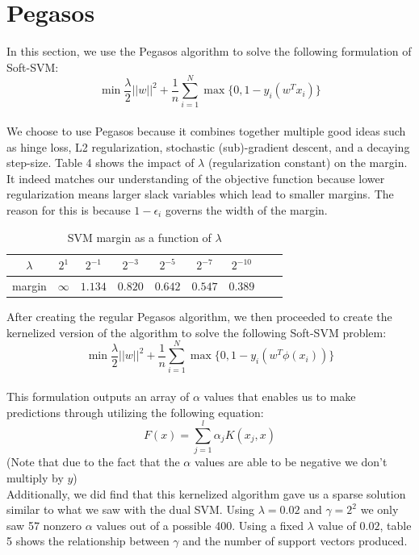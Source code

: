 \documentclass{article}
\begin{document}
\section{Pegasos}

In this section, we use the Pegasos algorithm to solve the following formulation of Soft-SVM: \\
$$\min \frac{\lambda}{2} ||w||^2 + \frac{1}{n} \sum_{i=1}^{N}  \max \{0,1 - y_i(w^T x_i)\}$$\\
We choose to use Pegasos because it combines together multiple good ideas such as hinge loss, L2 regularization, stochastic (sub)-gradient descent, and a decaying step-size. Table 4 shows the impact of $\lambda$ (regularization constant) on the margin. It indeed matches our understanding of the objective function because lower regularization means larger slack variables which lead to smaller margins. The reason for this is because $1-\epsilon_i$ governs the width of the margin.

\begin{table}
  \begin{center}
    \begin{tabular}{ | c | c | c | c | c | c | c | c | c |}
      \hline
       $\lambda$& $2^1$       & $2^{-1}$&  $2^{-3}$& $2^{-5}$&  $2^{-7}$&  $2^{-10}$ \\ \hline
       margin       & $\infty$     & $1.134$&   $0.820$& $0.642$&  $0.547$&   $0.389$  \\ \hline

    \end{tabular}
  \end{center}
  \caption{SVM margin as a function of $\lambda$}
\end{table}

After creating the regular Pegasos algorithm, we then proceeded to create the kernelized version of the algorithm to solve the following Soft-SVM problem: \\
$$\min \frac{\lambda}{2} ||w||^2 + \frac{1}{n} \sum_{i=1}^{N}  \max \{0,1 - y_i(w^T \phi(x_i))\}$$\\

This formulation outputs an array of $\alpha$ values that enables us to make predictions through utilizing the following equation: \\
$$F(x) = \sum_{j=1}^{l} \alpha_jK(x_j,x)$$ (Note that due to the fact that the $\alpha$ values are able to be negative we don't multiply by $y$) \\
Additionally, we did find that this kernelized algorithm gave us a sparse solution similar to what we saw with the dual SVM. Using $\lambda = 0.02$ and $\gamma = 2^2$ we only saw 57 nonzero $\alpha$ values out of a possible 400. Using a fixed $\lambda$ value of $0.02$, table 5 shows the relationship between $\gamma$ and the number of support vectors produced.
\end{document}
